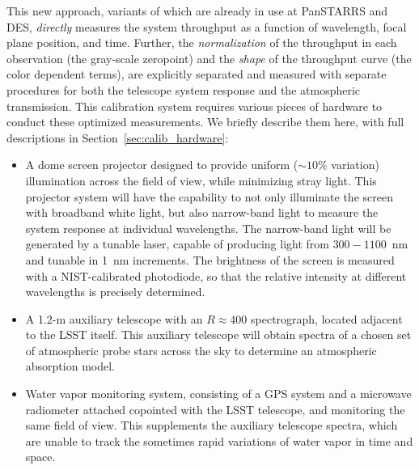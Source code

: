 \documentclass[12pt,preprint]{aastex}
\begin{document}
This new approach, variants of which are already in use at PanSTARRS and DES,
{\it directly} measures the system throughput as a function of wavelength, 
focal plane position, and time.  Further, the {\it
normalization} of the throughput in each observation (the gray-scale
zeropoint) and the {\it shape} of the throughput curve (the color
dependent terms), are explicitly separated and measured with separate procedures
for both the telescope system response and the atmospheric transmission.  
This calibration system requires various
pieces of hardware to conduct these optimized measurements. We briefly
describe them here, with full descriptions in Section~\ref{sec:calib_hardware}:

\begin{itemize}
\item{A dome screen projector designed to provide uniform
    ($\sim10\%$ variation) illumination across the field of view, while
    minimizing stray light. This projector system will have the
    capability to not only illuminate the screen with broadband white
    light, but also narrow-band light to measure the system response
    at individual wavelengths. The narrow-band light will be generated
    by a tunable laser, capable of producing light from $300-1100$~nm
    and tunable in 1~nm increments. The brightness of the screen is measured 
    with a NIST-calibrated photodiode, so that the relative intensity at different 
    wavelengths is precisely determined. } 
\item{A 1.2-m auxiliary telescope with an $R \approx 400$ spectrograph,
    located adjacent to the LSST itself. This auxiliary telescope will
    obtain spectra of a chosen set of atmospheric probe stars across the sky to
    determine an atmospheric absorption model.} 
\item{Water vapor monitoring system, consisting of a GPS system and a 
    microwave radiometer attached copointed with the LSST telescope, and monitoring 
    the same field of view.  This supplements the auxiliary telescope spectra, which are
    unable to track the sometimes rapid variations of water vapor in time and space.}  
\end{itemize}
\end{document}
